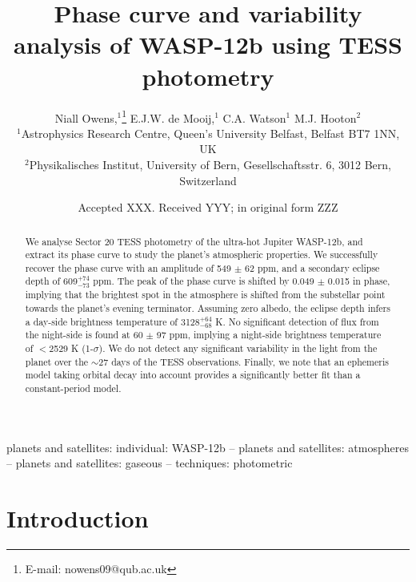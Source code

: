 \documentclass[fleqn,usenatbib]{mnras}
\title[TESS phase curve of WASP-12b]{Phase curve and variability analysis of WASP-12b using TESS photometry}
\author[N. Owens et al.]{
Niall Owens,$^{1}$\thanks{E-mail: nowens09@qub.ac.uk}
E.J.W. de Mooij,$^{1}$
C.A. Watson$^{1}$
M.J. Hooton$^{2}$
\\
$^{1}$Astrophysics Research Centre, Queen’s University Belfast, Belfast BT7 1NN, UK\\
$^{2}$Physikalisches Institut, University of Bern, Gesellschaftsstr. 6, 3012 Bern, Switzerland\\
}
\date{Accepted XXX. Received YYY; in original form ZZZ}
\begin{document}
\label{firstpage}
\pagerange{\pageref{firstpage}--\pageref{lastpage}}
\maketitle

\begin{abstract}
We analyse Sector 20 TESS photometry of the ultra-hot Jupiter WASP-12b, and extract its phase curve to study the planet's atmospheric properties. We successfully recover the phase curve with an amplitude of 549 $\pm$ 62 ppm, and a secondary eclipse depth of 609$^{+74}_{-73}$ ppm. The peak of the phase curve is shifted by 0.049 $\pm$ 0.015 in phase, implying that the brightest spot in the atmosphere is shifted from the substellar point towards the planet's evening terminator. Assuming zero albedo, the eclipse depth infers a day-side brightness temperature of 3128$^{+64}_{-68}$ K. No significant detection of flux from the night-side is found at 60 $\pm$ 97 ppm, implying a night-side brightness temperature of $<$2529 K (1-$\sigma$). We do not detect any significant variability in the light from the planet over the $\sim$27 days of the TESS observations. Finally, we note that an ephemeris model taking orbital decay into account provides a significantly better fit than a constant-period model. 
\end{abstract}

\begin{keywords}
planets and satellites: individual: WASP-12b -- planets and satellites: atmospheres -- planets and satellites: gaseous -- techniques: photometric
\end{keywords}



\section{Introduction}
\end{document}
